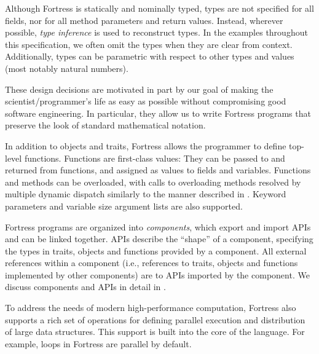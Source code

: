Although Fortress is statically and nominally typed,
types are not specified for all fields,
nor for all method parameters and return values.
Instead, wherever possible,
\emph{type inference}
is used
to reconstruct types.
In the examples throughout this specification,
we often omit the types when they are clear from context.
Additionally, types can be parametric with respect to other
types and values (most notably natural numbers).

These design decisions are motivated in part
by our goal
of making the scientist/programmer's life as easy as possible
without compromising good software engineering.
In particular,
they allow us to write Fortress programs
that preserve the look of standard
mathematical notation.

In addition to objects and traits,
Fortress allows the programmer to define top-level functions.
Functions are first-class values:
They can be passed to and returned from functions,
and assigned as values to fields and variables.
Functions and methods can be overloaded, with calls
to overloading methods resolved by multiple dynamic dispatch
similarly to the manner described in \cite{MillsteinChambers}.
\label{nutshellKwd}
Keyword parameters and variable size argument lists
are also supported.



Fortress programs are organized into
\emph{components},
which export and import APIs
and can be linked together.
APIs describe the ``shape'' of a component,
specifying the types in traits, objects and functions
provided by a component.
All external references within a component
(i.e., references to traits, objects and functions
implemented by other components)
are to APIs imported by the component.
We discuss components and APIs in detail
in .

To address the needs of modern high-performance computation,
Fortress also supports a rich set of operations for defining parallel execution
and distribution
of large data structures. This support is built into the core of the language.
For example,  loops in Fortress are parallel by default.
